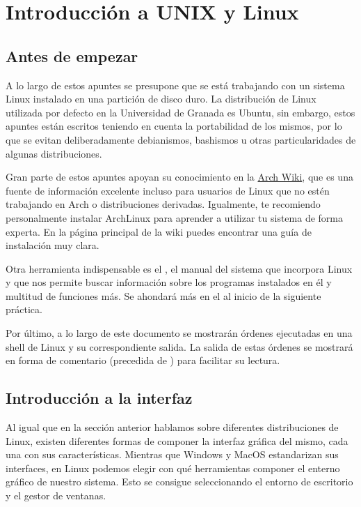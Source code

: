 \chapter{Introducción a UNIX y Linux}

\setcounter{section}{-1}

\section{Antes de empezar}

A lo largo de estos apuntes se presupone que se está trabajando con un sistema Linux instalado en una partición de disco duro.
La distribución de Linux utilizada por defecto en la Universidad de Granada es Ubuntu, sin embargo, estos apuntes están escritos teniendo en cuenta la portabilidad de los mismos, por lo que se evitan deliberadamente debianismos, bashismos u otras particularidades de algunas distribuciones.

Gran parte de estos apuntes apoyan su conocimiento en la \href{https://wiki.archlinux.org/}{Arch Wiki}, que es una fuente de información excelente incluso para usuarios de Linux que no estén trabajando en Arch o distribuciones derivadas.
Igualmente, te recomiendo personalmente instalar ArchLinux para aprender a utilizar tu sistema de forma experta.
En la página principal de la wiki puedes encontrar una guía de instalación muy clara.

Otra herramienta indispensable es el , el manual del sistema que incorpora Linux y que nos permite buscar información sobre los programas instalados en él y multitud de funciones más.
Se ahondará más en el al inicio de la siguiente práctica.

Por último, a lo largo de este documento se mostrarán órdenes ejecutadas en una shell de Linux y su correspondiente salida.
La salida de estas órdenes se mostrará en forma de comentario (precedida de \code{\#}) para facilitar su lectura.

\section{Introducción a la interfaz}

Al igual que en la sección anterior hablamos sobre diferentes distribuciones de Linux, existen diferentes formas de componer la interfaz gráfica del mismo, cada una con sus características.
Mientras que Windows y MacOS estandarizan sus interfaces, en Linux podemos elegir con qué herramientas componer el enterno gráfico de nuestro sistema.
Esto se consigue seleccionando el entorno de escritorio y el gestor de ventanas.

